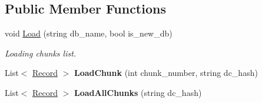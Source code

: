 \subsection*{Public Member Functions}
\begin{DoxyCompactItemize}
\item 
void \hyperlink{class_dwarf_d_b_1_1_chunk_manager_1_1_chunk_manager_a607e45973d9d32b61e0f18edb09f1229}{Load} (string db\_\-name, bool is\_\-new\_\-db)
\begin{DoxyCompactList}\small\item\em Loading chunks list. \item\end{DoxyCompactList}\item 
\hypertarget{class_dwarf_d_b_1_1_chunk_manager_1_1_chunk_manager_a8be3a24a6c82e512d0eb547affa86701}{
List$<$ \hyperlink{class_dwarf_d_b_1_1_data_structures_1_1_record}{Record} $>$ {\bfseries LoadChunk} (int chunk\_\-number, string dc\_\-hash)}
\label{class_dwarf_d_b_1_1_chunk_manager_1_1_chunk_manager_a8be3a24a6c82e512d0eb547affa86701}

\item 
\hypertarget{class_dwarf_d_b_1_1_chunk_manager_1_1_chunk_manager_a8b2837bcd58aba42d46cf9327a6563fb}{
List$<$ \hyperlink{class_dwarf_d_b_1_1_data_structures_1_1_record}{Record} $>$ {\bfseries LoadAllChunks} (string dc\_\-hash)}
\label{class_dwarf_d_b_1_1_chunk_manager_1_1_chunk_manager_a8b2837bcd58aba42d46cf9327a6563fb}


\end{DoxyCompactItemize}
